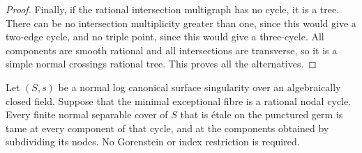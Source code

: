 \begin{proof}
Finally, if the rational intersection multigraph
has no cycle, it is a tree.  There can be no
intersection multiplicity greater than one, since
this would give a two-edge cycle, and no triple
point, since this would give a three-cycle.
All components are smooth rational and all
intersections are transverse, so it is a simple
normal crossings rational tree.  This proves all
the alternatives.
\end{proof}

\begin{theorem}
\label{D:lc-cusp-tame}
Let $(S,s)$ be a normal log canonical surface singularity
over an algebraically closed field.  Suppose that the
minimal exceptional fibre is a rational nodal cycle.
Every finite normal separable cover of $S$ that is
\'etale on the punctured germ is tame at every component
of that cycle, and at the components obtained by
subdividing its nodes.  No Gorenstein or index
restriction is required.
\end{theorem}
